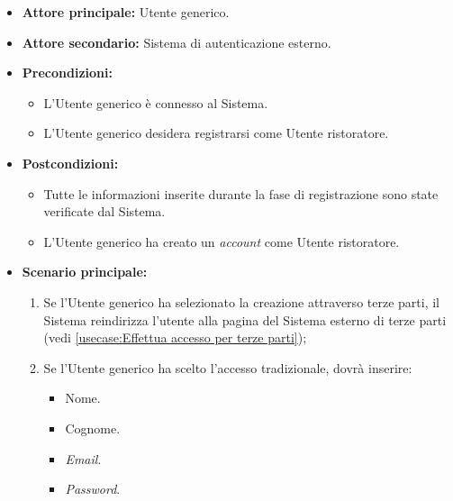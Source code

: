 \label{usecase:Effettua registrazione Utente ristoratore}
\begin{itemize}

	\item \textbf{Attore principale:} Utente generico.
	\item \textbf{Attore secondario:} Sistema di autenticazione esterno. 

	\item \textbf{Precondizioni:} 
	\begin{itemize}
        \item  L'Utente generico è connesso al Sistema.
        \item  L'Utente generico desidera registrarsi come Utente ristoratore.
    \end{itemize}
    

	\item \textbf{Postcondizioni:} 
    \begin{itemize}
        \item  Tutte le informazioni inserite durante la fase di registrazione sono state verificate dal Sistema.
        \item  L'Utente generico ha creato un \textit{account} come Utente ristoratore.
    \end{itemize}

	\item \textbf{Scenario principale:}
	\begin{enumerate}

            \item Se l'Utente generico ha selezionato la creazione attraverso terze parti, il Sistema reindirizza l'utente alla pagina del Sistema esterno di terze parti (vedi \autoref{usecase:Effettua accesso per terze parti});
            \item Se l'Utente generico ha scelto l'accesso tradizionale, dovrà inserire:
            \begin{itemize}
                \item Nome.
                \item Cognome.
                \item \textit{Email}.
                \item \textit{Password}.
            \end{itemize}


\end{enumerate}
\end{itemize}
